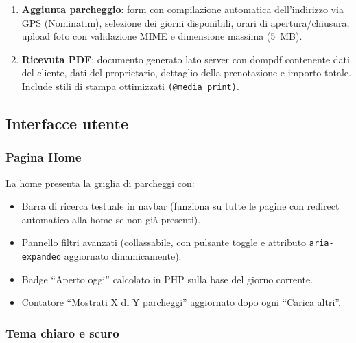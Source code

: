 \documentclass[12pt, a4paper]{article}
\begin{document}
\begin{enumerate}[leftmargin=*, label=\textbf{\arabic*.}]
    \item \textbf{Aggiunta parcheggio}: form con compilazione automatica
    dell'indirizzo via GPS (Nominatim), selezione dei giorni disponibili,
    orari di apertura/chiusura, upload foto con validazione MIME e
    dimensione massima (5~MB).

    \item \textbf{Ricevuta PDF}: documento generato lato server con dompdf
    contenente dati del cliente, dati del proprietario, dettaglio della
    prenotazione e importo totale. Include stili di stampa ottimizzati
    \texttt{(@media print)}.
\end{enumerate}

\subsection{Interfacce utente}

\subsubsection{Pagina Home}

La home presenta la griglia di parcheggi con:
\begin{itemize}
    \item Barra di ricerca testuale in navbar (funziona su tutte le pagine con
    redirect automatico alla home se non già presenti).
    \item Pannello filtri avanzati (collassabile, con pulsante toggle e attributo
    \texttt{aria-expanded} aggiornato dinamicamente).
    \item Badge ``Aperto oggi'' calcolato in PHP sulla base del giorno corrente.
    \item Contatore ``Mostrati X di Y parcheggi'' aggiornato dopo ogni ``Carica altri''.
\end{itemize}

\subsubsection{Tema chiaro e scuro}
\end{document}
